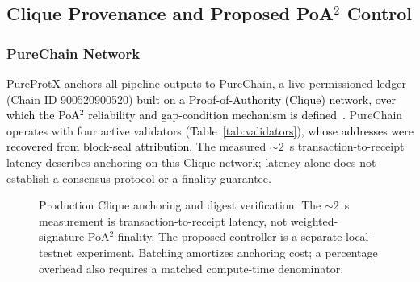 \documentclass[conference]{IEEEtran}
\newcommand{\rev}[2]{#2}
\begin{document}
\subsection{\textbf{\rev{R1.2, R2.4}{Clique Provenance and Proposed PoA$^2$ Control}}}
\label{sec:blockchain}

\subsubsection{PureChain Network}

PureProtX anchors all pipeline outputs to PureChain, a
live permissioned ledger (Chain ID 900520900520)
\textcolor{black}{built on a Proof-of-Authority (Clique) network, over
which the PoA$^2$ reliability and gap-condition mechanism is
defined~\cite{kim2025proof, ajakwe2025ebctc}.}
PureChain operates with four active validators (\textcolor{black}{Table~\ref{tab:validators}}),
\textcolor{black}{whose addresses were recovered from block-seal
attribution.} \rev{R2.4}{The measured ${\sim}2$~s transaction-to-receipt
latency describes anchoring on this Clique network; latency alone
does not establish a consensus protocol or a finality guarantee.}

\begin{figure}[!t]
\centering
{}
\caption{\rev{R1.1, R1.2, R1.3, R1.4, R2.2, R2.4}{Production
Clique anchoring and digest verification. The ${\sim}2$~s
measurement is transaction-to-receipt latency, not weighted-signature
PoA$^2$ finality. The proposed controller is a separate local-testnet
experiment. Batching amortizes anchoring cost; a percentage overhead
also requires a matched compute-time denominator.}}

\label{fig:poa-provenance}
\end{figure}
\end{document}
